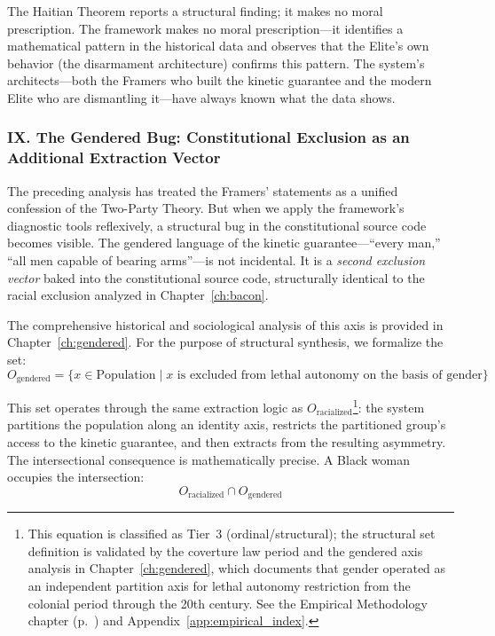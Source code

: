 The Haitian Theorem reports a structural finding; it makes no moral prescription. The framework makes no moral prescription---it identifies a mathematical pattern in the historical data and observes that the Elite's own behavior (the disarmament architecture) confirms this pattern. The system's architects---both the Framers who built the kinetic guarantee and the modern Elite who are dismantling it---have always known what the data shows.

\subsubsection*{IX. The Gendered Bug: Constitutional Exclusion as an Additional Extraction Vector}

The preceding analysis has treated the Framers' statements as a unified confession of the Two-Party Theory. But when we apply the framework's diagnostic tools reflexively, a structural bug in the constitutional source code becomes visible. The gendered language of the kinetic guarantee---``every man,'' ``all men capable of bearing arms''---is not incidental. It is a \textit{second exclusion vector} baked into the constitutional source code, structurally identical to the racial exclusion analyzed in Chapter~\ref{ch:bacon}.

The comprehensive historical and sociological analysis of this axis is provided in Chapter~\ref{ch:gendered}. For the purpose of structural synthesis, we formalize the set:
\begin{equation}\label{eq:12.7-gendered-outgroup-set}
O_{\text{gendered}} = \{x \in \text{Population} \mid x \text{ is excluded from lethal autonomy on the basis of gender}\}
\end{equation}

This set operates through the same extraction logic as $O_{\text{racialized}}$\footnote{This equation is classified as Tier~3 (ordinal/structural); the structural set definition is validated by the coverture law period and the gendered axis analysis in Chapter~\ref{ch:gendered}, which documents that gender operated as an independent partition axis for lethal autonomy restriction from the colonial period through the 20th century. See the Empirical Methodology chapter (p.~\pageref{ch:empirical_methodology}) and Appendix~\ref{app:empirical_index}.}: the system partitions the population along an identity axis, restricts the partitioned group's access to the kinetic guarantee, and then extracts from the resulting asymmetry. The intersectional consequence is mathematically precise. A Black woman occupies the intersection:
\begin{equation}\label{eq:12.8-intersection-double-partition}
O_{\text{racialized}} \cap O_{\text{gendered}}
\end{equation}

